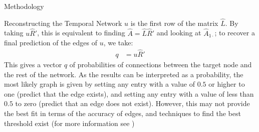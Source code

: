 \documentclass[12pt]{amsbook}
\begin{document}
\begin{chapter}{Methodology}
    \begin{section}{Reconstructing the Temporal Network}
        $u$ is the first row of the matrix $\hat L$. By taking $u\hat R'$, this is equivalent to finding $\hat A = \hat L \hat R'$ and looking at $\hat A_{1\cdot}$; to recover a final prediction of the edges of $u$, we take:
        \begin{align}
            q &= u \hat R'
        \end{align}
        This gives a vector $q$ of probabilities of connections between the target node and the rest of the network. As the results can be interpreted as a probability, the most likely graph is given by setting any entry with a value of $0.5$ or higher to one (predict that the edge exists), and setting any entry with a value of less than $0.5$ to zero (predict that an edge does not exist). However, this may not provide the best fit in terms of the accuracy of edges, and techniques to find the best threshold exist (for more information see \cite{strydomEtAl})
    \end{section}
\end{chapter}
\end{document}
